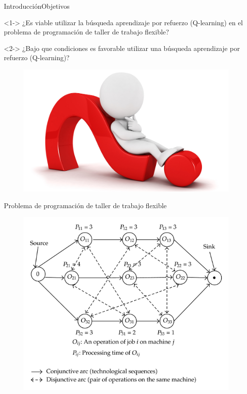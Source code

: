 \documentclass{beamer}
\begin{document}
\begin{frame}{Introducción}{Objetivos}
\begin{block}<1->{}
    ¿Es viable utilizar la búsqueda aprendizaje por refuerzo (Q-learning) en el problema
de programación de taller de trabajo flexible?
\end{block}
\begin{block}<2->{}
	¿Bajo que
condiciones es favorable utilizar una búsqueda aprendizaje por refuerzo (Q-learning)?
\end{block}
\begin{figure}
	\includegraphics[scale = 0.5]{preguntas}
\end{figure}
\end{frame}

\begin{frame}{Problema de programación de taller de trabajo flexible}
        \begin{figure}[h!t]
        \centering
        \includegraphics[scale = 1.25 ]{imagen3.jpg}
        \end{figure}
\end{frame}
\end{document}
